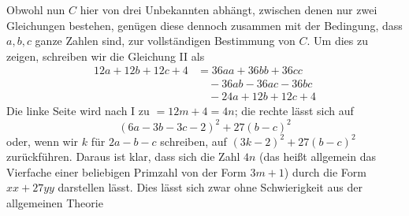 Obwohl nun \(C\) hier von drei Unbekannten abhängt, zwischen denen nur zwei Gleichungen bestehen, genügen diese dennoch zusammen mit der Bedingung, dass \(a,\allowbreak b,\allowbreak c\) ganze Zahlen sind, zur vollständigen Bestimmung von \(C\). Um dies zu zeigen, schreiben wir die Gleichung II als \[\begin{aligned}12a+12b+12c+4&=36aa+36bb+36cc\\&\quad-36ab-36ac-36bc\\&\quad-24a+12b+12c+4\end{aligned}\] Die linke Seite wird nach I zu \(=12m+4=4n\); die rechte lässt sich auf \[(6a-3b-3c-2)^2+27(b-c)^2\] oder, wenn wir \(k\) für \(2a-b-c\) schreiben, auf \((3k-2)^2+27(b-c)^2\) zurückführen. Daraus ist klar, dass sich die Zahl \(4n\) (das heißt allgemein das Vierfache einer beliebigen Primzahl von der Form \(3m+1\)) durch die Form \(xx+27yy\) darstellen lässt. Dies lässt sich zwar ohne Schwierigkeit aus der allgemeinen Theorie
